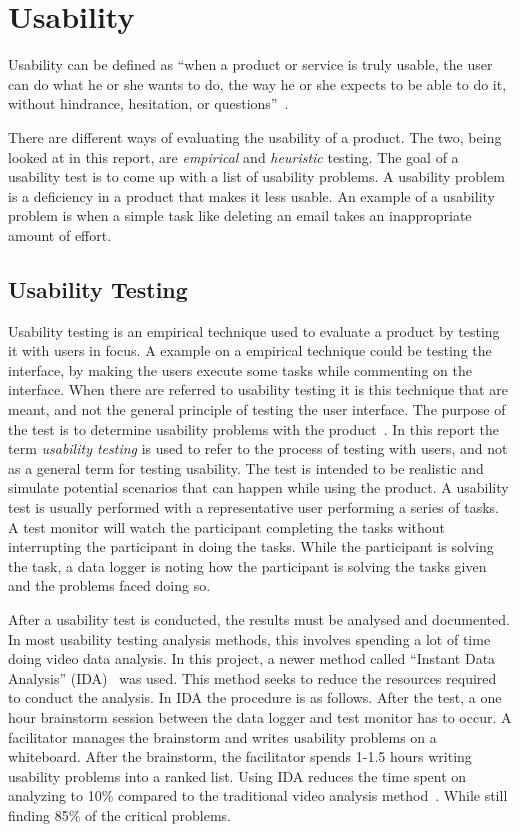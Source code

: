 \section{Usability}
\label{sub:usability}

Usability can be defined as \enquote{when a product or service is truly usable, the user can do what he or she wants to do, the way he or she expects to be able to do it, without hindrance, hesitation, or questions}~\cite{RubinChisnellSpool08}.

There are different ways of evaluating the usability of a product. The two, being looked at in this report, are \textit{empirical} and \textit{heuristic} testing. The goal of a usability test is to come up with a list of usability problems. A usability problem is a deficiency in a product that makes it less usable. An example of a usability problem is when a simple task like deleting an email takes an inappropriate amount of effort.

\subsection{Usability Testing}
\label{sub:usabilityTesting}
Usability testing is an empirical technique used to evaluate a product by testing it with users in focus. A example on a empirical technique could be testing the interface, by making the users execute some tasks while commenting on the interface. When there are referred to usability testing it is this technique that are meant, and not the general principle of testing the user interface. The purpose of the test is to determine usability problems with the product~\cite{RubinChisnellSpool08}. In this report the term \emph{usability testing} is used to refer to the process of testing with users, and not as a general term for testing usability. The test is intended to be realistic and simulate potential scenarios that can happen while using the product. A usability test is usually performed with a representative user performing a series of tasks. A test monitor will watch the participant completing the tasks without interrupting the participant in doing the tasks. While the participant is solving the task, a data logger is noting how the participant is solving the tasks given and the problems faced doing so.

After a usability test is conducted, the results must be analysed and documented. In most usability testing analysis methods, this involves spending a lot of time doing video data analysis. In this project, a newer method called \enquote{Instant Data Analysis} (IDA)~\cite{kjeldskov2004instant} was used. This method seeks to reduce the resources required to conduct the analysis. In IDA the procedure is as follows. After the test, a one hour brainstorm session between the data logger and test monitor has to occur. A facilitator manages the brainstorm and writes usability problems on a whiteboard. After the brainstorm, the facilitator spends 1-1.5 hours writing usability problems into a ranked list. Using IDA reduces the time spent on analyzing to 10\% compared to the traditional video analysis method~\cite{kjeldskov2004instant}. While still finding 85\% of the critical problems.

